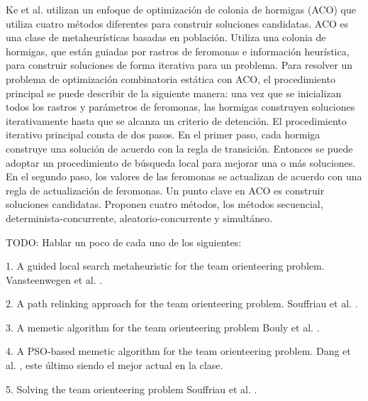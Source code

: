 \bigskip

Ke et al. \cite{KeArchettiFeng} utilizan un enfoque de optimización de colonia de hormigas (ACO) que utiliza cuatro métodos diferentes para construir soluciones candidatas. ACO es una clase de metaheurísticas basadas en población. Utiliza una colonia de hormigas, que están guiadas por rastros de feromonas e información heurística, para construir soluciones de forma iterativa para un problema. Para resolver un problema de optimización combinatoria estática con ACO, el procedimiento principal se puede describir de la siguiente manera: una vez que se inicializan todos los rastros y parámetros de feromonas, las hormigas construyen soluciones iterativamente hasta que se alcanza un criterio de detención. El procedimiento iterativo principal consta de dos pasos. En el primer paso, cada hormiga construye una solución de acuerdo con la regla de transición. Entonces se puede adoptar un procedimiento de búsqueda local para mejorar una o más soluciones. En el segundo paso, los valores de las feromonas se actualizan de acuerdo con una regla de actualización de feromonas. Un punto clave en ACO es construir soluciones candidatas. Proponen cuatro métodos, los métodos secuencial, determinista-concurrente, aleatorio-concurrente y simultáneo.

\bigskip

TODO: Hablar un poco de cada uno de los siguientes:

1. 
A guided local search metaheuristic for the team orienteering problem. Vansteenwegen et al. \cite{VansteenwegenSouffriauBergheOudheusden}.

2. 
A path relinking approach for the team orienteering problem. Souffriau et al. \cite{SouffriauVansteenwegenBergheOudheusden}.

3. 
A memetic algorithm for the team orienteering problem Bouly et al. \cite{BoulyDangMoukrim}.

4. 
A PSO-based memetic algorithm for the team orienteering problem. Dang et al. \cite{DangGuibadjMoukrim}, este último siendo el mejor actual en la clase. 

5.  
Solving the team orienteering problem Souffriau et al. \cite{SouffriauVansteenwegenBergheOudheusden}.

